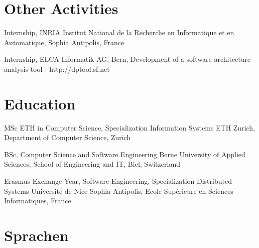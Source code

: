 \documentclass[10pt]{moderncv}
\begin{document}
\section{Other Activities}

{Internship, INRIA Institut National de la Recherche en Informatique et en Automatique, Sophia Antipolis, France}

{Internship, ELCA Informatik AG, Bern, Development of a software architecture analysis tool - http://dptool.sf.net}


\section{Education}
{MSc ETH in Computer Science, Specialization Information Systems}
{ETH Zurich, Department of Computer Science, Zurich}

{BSc, Computer Science and Software Engineering}
{Berne University of Applied Sciences, School of Engineering and IT, Biel, Switzerland}

{Erasmus Exchange Year, Software Engineering, Specialization Distributed Systems}
{Universit\'e de Nice Sophia Antipolis, Ecole Sup\'erieure en Sciences Informatiques, France}


\section{Sprachen}
\end{document}

